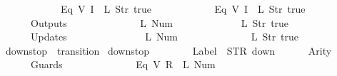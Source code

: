 \begin{isabellebody}
\ \ \ \ \ \ \ \ \ \ \ \ {\isacharparenleft}Eq\ {\isacharparenleft}V\ {\isacharparenleft}I\ {}{\isacharparenright}{\isacharparenright}\ {\isacharparenleft}L\ {\isacharparenleft}Str\ {\isacharprime}{\isacharprime}true{\isacharprime}{\isacharprime}{\isacharparenright}{\isacharparenright}{\isacharparenright}{\isacharcomma}\isanewline
\ \ \ \ \ \ \ \ \ \ \ \ {\isacharparenleft}Eq\ {\isacharparenleft}V\ {\isacharparenleft}I\ {}{\isacharparenright}{\isacharparenright}\ {\isacharparenleft}L\ {\isacharparenleft}Str\ {\isacharprime}{\isacharprime}true{\isacharprime}{\isacharprime}{\isacharparenright}{\isacharparenright}{\isacharparenright}\isanewline
\ \ \ \ \ \ {\isacharbrackright}{\isacharcomma}\isanewline
\ \ \ \ \ \ Outputs\ {\isacharequal}\ {\isacharbrackleft}\isanewline
\ \ \ \ \ \ \ \ \ \ \ \ {\isacharparenleft}L\ {\isacharparenleft}Num\ {}{\isacharparenright}{\isacharparenright}{\isacharcomma}\isanewline
\ \ \ \ \ \ \ \ \ \ \ \ {\isacharparenleft}L\ {\isacharparenleft}Str\ {\isacharprime}{\isacharprime}true{\isacharprime}{\isacharprime}{\isacharparenright}{\isacharparenright}\isanewline
\ \ \ \ \ \ {\isacharbrackright}{\isacharcomma}\isanewline
\ \ \ \ \ \ Updates\ {\isacharequal}\ {\isacharbrackleft}\isanewline
\ \ \ \ \ \ \ \ \ \ \ \ {\isacharparenleft}{}{\isacharcomma}\ {\isacharparenleft}L\ {\isacharparenleft}Num\ {}{\isacharparenright}{\isacharparenright}{\isacharparenright}{\isacharcomma}\isanewline
\ \ \ \ \ \ \ \ \ \ \ \ {\isacharparenleft}{}{\isacharcomma}\ {\isacharparenleft}L\ {\isacharparenleft}Str\ {\isacharprime}{\isacharprime}true{\isacharprime}{\isacharprime}{\isacharparenright}{\isacharparenright}{\isacharparenright}\isanewline
\ \ \ \ \ \ {\isacharbrackright}\isanewline
{\isasymrparr}{\isachardoublequoteclose}\isanewline
\isanewline
{}\isamarkupfalse%
\ {\isachardoublequoteopen}down{}{}stop{\isachardoublequoteclose}\ {\isacharcolon}{\isacharcolon}\ {\isachardoublequoteopen}transition{\isachardoublequoteclose}\ \isanewline
{\isachardoublequoteopen}down{}{}stop\ {\isasymequiv}\ {\isasymlparr}\isanewline
\ \ \ \ \ \ Label\ {\isacharequal}\ STR\ {\isacharprime}{\isacharprime}down{\isacharprime}{\isacharprime}{\isacharcomma}\isanewline
\ \ \ \ \ \ Arity\ {\isacharequal}\ {}{\isacharcomma}\isanewline
\ \ \ \ \ \ Guards\ {\isacharequal}\ {\isacharbrackleft}\isanewline
\ \ \ \ \ \ \ \ \ \ \ \ {\isacharparenleft}Eq\ {\isacharparenleft}V\ {\isacharparenleft}R\ {}{\isacharparenright}{\isacharparenright}\ {\isacharparenleft}L\ {\isacharparenleft}Num\ {}{\isacharparenright}{\isacharparenright}{\isacharparenright}{\isacharcomma}\isanewline

\end{isabellebody}
